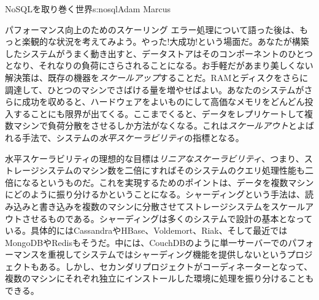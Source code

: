 \begin{aosachapter}{NoSQLを取り巻く世界}{s:nosql}{Adam Marcus}
\begin{aosasect1}{パフォーマンス向上のためのスケーリング}
エラー処理について語った後は、もっと楽観的な状況を考えてみよう。やった!大成功!という場面だ。あなたが構築したシステムがうまく動き出すと、データストアはそのコンポーネントのひとつとなり、それなりの負荷にさらされることになる。お手軽だがあまり美しくない解決策は、既存の機器を\emph{スケールアップ}することだ。RAMとディスクをさらに調達して、ひとつのマシンでさばける量を増やせばよい。あなたのシステムがさらに成功を収めると、ハードウェアをよいものにして高価なメモリをどんどん投入することにも限界が出てくる。ここまでくると、データをレプリケートして複数マシンで負荷分散をさせるしか方法がなくなる。これは\emph{スケールアウト}とよばれる手法で、システムの\emph{水平スケーラビリティ}の指標となる。

水平スケーラビリティの理想的な目標は\emph{リニアなスケーラビリティ}、つまり、ストレージシステムのマシン数を二倍にすればそのシステムのクエリ処理性能も二倍になるというものだ。これを実現するためのポイントは、データを複数マシンにどのように振り分けるかということになる。シャーディングという手法は、読み込みと書き込みを複数のマシンに分散させてストレージシステムをスケールアウトさせるものである。シャーディングは多くのシステムで設計の基本となっている。具体的にはCassandraやHBase、Voldemort、Riak、そして最近ではMongoDBやRedisもそうだ。中には、CouchDBのように単一サーバーでのパフォーマンスを重視してシステムではシャーディング機能を提供しないというプロジェクトもある。しかし、セカンダリプロジェクトがコーディネーターとなって、複数のマシンにそれぞれ独立にインストールした環境に処理を振り分けることもできる。


\end{aosasect1}
\end{aosachapter}
